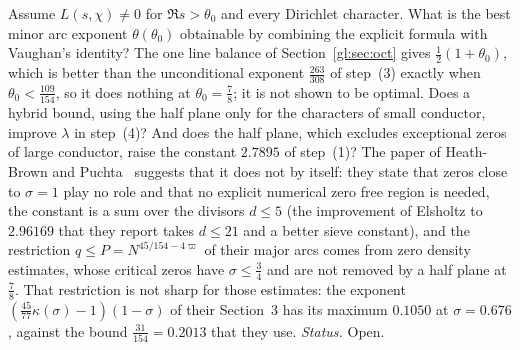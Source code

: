 \begin{problem}\label{gl:op:quasi}
Assume $L(s,\chi)\ne0$ for $\Re s>\theta_0$ and every Dirichlet character. What is the best minor arc exponent $\theta(\theta_0)$ obtainable by combining the explicit formula with Vaughan's identity? The one line balance of Section~\ref{gl:sec:oct} gives $\tfrac12(1+\theta_0)$, which is better than the unconditional exponent $\tfrac{263}{308}$ of step~(3) exactly when $\theta_0<\tfrac{109}{154}$, so it does nothing at $\theta_0=\tfrac78$; it is not shown to be optimal. Does a hybrid bound, using the half plane only for the characters of small conductor, improve $\lambda$ in step~(4)? And does the half plane, which excludes exceptional zeros of large conductor, raise the constant $2.7895$ of step~(1)? The paper of Heath-Brown and Puchta~\cite{HBP02} suggests that it does not by itself: they state that zeros close to $\sigma=1$ play no role and that no explicit numerical zero free region is needed, the constant is a sum over the divisors $d\le5$ (the improvement of Elsholtz to $2.96169$ that they report takes $d\le21$ and a better sieve constant), and the restriction $q\le P=N^{45/154-4\varpi}$ of their major arcs comes from zero density estimates, whose critical zeros have $\sigma\le\tfrac34$ and are not removed by a half plane at $\tfrac78$. That restriction is not sharp for those estimates: the exponent $(\tfrac{45}{77}\kappa(\sigma)-1)(1-\sigma)$ of their Section~3 has its maximum $0.1050$ at $\sigma=0.676$, against the bound $\tfrac{31}{154}=0.2013$ that they use. \emph{Status.} Open.
\end{problem}

